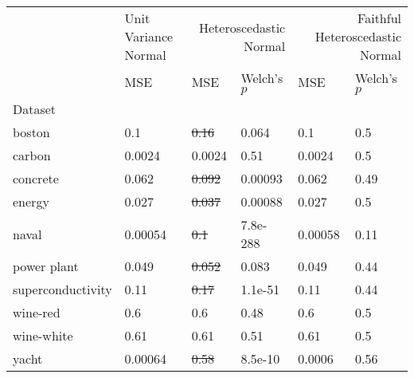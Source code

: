 \begin{tabular}{l|l|ll|ll}
\toprule
 & Unit Variance Normal & \multicolumn{2}{r}{Heteroscedastic Normal} & \multicolumn{2}{r}{Faithful Heteroscedastic Normal} \\
 & MSE & MSE & Welch's $p$ & MSE & Welch's $p$ \\
Dataset &  &  &  &  &  \\
\midrule
boston & 0.1 & \sout{0.16} & 0.064 & 0.1 & 0.5 \\
carbon & 0.0024 & 0.0024 & 0.51 & 0.0024 & 0.5 \\
concrete & 0.062 & \sout{0.092} & 0.00093 & 0.062 & 0.49 \\
energy & 0.027 & \sout{0.037} & 0.00088 & 0.027 & 0.5 \\
naval & 0.00054 & \sout{0.1} & 7.8e-288 & 0.00058 & 0.11 \\
power plant & 0.049 & \sout{0.052} & 0.083 & 0.049 & 0.44 \\
superconductivity & 0.11 & \sout{0.17} & 1.1e-51 & 0.11 & 0.44 \\
wine-red & 0.6 & 0.6 & 0.48 & 0.6 & 0.5 \\
wine-white & 0.61 & 0.61 & 0.51 & 0.61 & 0.5 \\
yacht & 0.00064 & \sout{0.58} & 8.5e-10 & 0.0006 & 0.56 \\
\bottomrule
\end{tabular}
